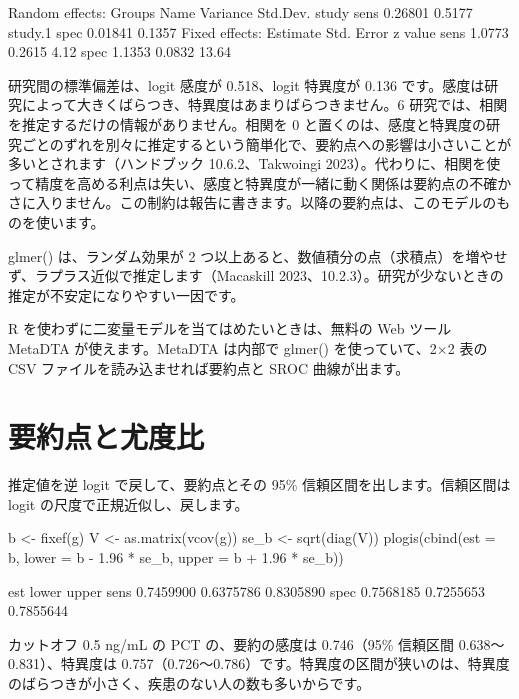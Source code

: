 \begin{rout}
Random effects:
 Groups  Name Variance Std.Dev.
 study   sens 0.26801  0.5177
 study.1 spec 0.01841  0.1357
Fixed effects:
     Estimate Std. Error z value
sens   1.0773     0.2615    4.12
spec   1.1353     0.0832   13.64
\end{rout}

研究間の標準偏差は、logit 感度が 0.518、logit 特異度が 0.136 です。感度は研究によって大きくばらつき、特異度はあまりばらつきません。6 研究では、相関を推定するだけの情報がありません。相関を 0 と置くのは、感度と特異度の研究ごとのずれを別々に推定するという簡単化で、要約点への影響は小さいことが多いとされます（ハンドブック 10.6.2、Takwoingi 2023）。代わりに、相関を使って精度を高める利点は失い、感度と特異度が一緒に動く関係は要約点の不確かさに入りません。この制約は報告に書きます。以降の要約点は、このモデルのものを使います。

\begin{hattenbox}
glmer() は、ランダム効果が 2 つ以上あると、数値積分の点（求積点）を増やせず、ラプラス近似で推定します（Macaskill 2023、10.2.3）。研究が少ないときの推定が不安定になりやすい一因です。
\end{hattenbox}

\begin{KKfbox9ao}[R を使わない場合]
R を使わずに二変量モデルを当てはめたいときは、無料の Web ツール MetaDTA が使えます。MetaDTA は内部で glmer() を使っていて、2×2 表の CSV ファイルを読み込ませれば要約点と SROC 曲線が出ます。
\end{KKfbox9ao}

\section{要約点と尤度比}
\label{sec:13-5}

推定値を逆 logit で戻して、要約点とその 95\% 信頼区間を出します。信頼区間は logit の尺度で正規近似し、戻します。

\begin{rcode}
b <- fixef(g)
V <- as.matrix(vcov(g))
se_b <- sqrt(diag(V))
plogis(cbind(est = b, lower = b - 1.96 * se_b,
             upper = b + 1.96 * se_b))
\end{rcode}

\begin{rout}
           est     lower     upper
sens 0.7459900 0.6375786 0.8305890
spec 0.7568185 0.7255653 0.7855644
\end{rout}

カットオフ 0.5 ng/mL の PCT の、要約の感度は 0.746（95\% 信頼区間 0.638〜0.831）、特異度は 0.757（0.726〜0.786）です。特異度の区間が狭いのは、特異度のばらつきが小さく、疾患のない人の数も多いからです。

